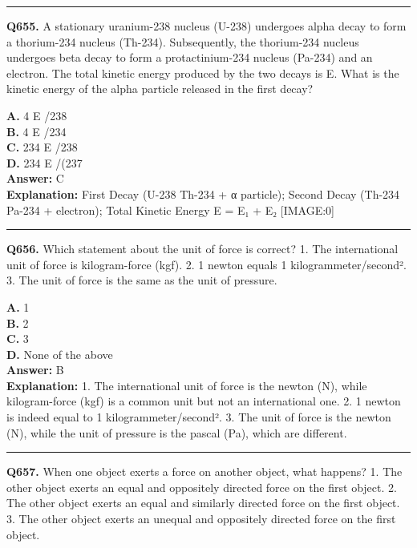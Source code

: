 \documentclass[12pt]{article}
\begin{document}
\hrule
\vspace{1em}


\noindent
\textbf{Q655.} A stationary uranium-238 nucleus (U-238) undergoes alpha decay to form a thorium-234 nucleus (Th-234). Subsequently, the thorium-234 nucleus undergoes beta decay to form a protactinium-234 nucleus (Pa-234) and an electron. The total kinetic energy produced by the two decays is E. What is the kinetic energy of the alpha particle released in the first decay?



\textbf{A.} 4
E
​/238 \\
\textbf{B.} 4
E
​/234 \\
\textbf{C.} 234
E
​/238 \\
\textbf{D.} 234
E
​/(237 \\

\textbf{Answer:} C \\
\textbf{Explanation:} First Decay (U-238 \to  Th-234 + α particle); Second Decay (Th-234 \to  Pa-234 + electron); Total Kinetic Energy E = E₁ + E₂
[IMAGE:0]

\hrule
\vspace{1em}


\noindent
\textbf{Q656.} Which statement about the unit of force is correct?
1.
The international unit of force is kilogram-force (kgf).
2.
1 newton equals 1 kilogram\cdot meter/second².
3.
The unit of force is the same as the unit of pressure.



\textbf{A.} 1 \\
\textbf{B.} 2 \\
\textbf{C.} 3 \\
\textbf{D.} None of the above \\

\textbf{Answer:} B \\
\textbf{Explanation:} 1.
The international unit of force is the newton (N), while kilogram-force (kgf) is a common unit but not an international one.
2.
1 newton is indeed equal to 1 kilogram\cdot meter/second².
3.
The unit of force is the newton (N), while the unit of pressure is the pascal (Pa), which are different.

\hrule
\vspace{1em}


\noindent
\textbf{Q657.} When one object exerts a force on another object, what happens?
1.
The other object exerts an equal and oppositely directed force on the first object.
2.
The other object exerts an equal and similarly directed force on the first object.
3.
The other object exerts an unequal and oppositely directed force on the first object.
\end{document}
